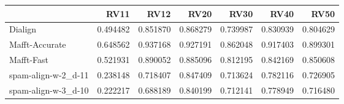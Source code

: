 \begin{tabular}{lrrrrrr}
\toprule
{} &      RV11 &      RV12 &      RV20 &      RV30 &      RV40 &      RV50 \\
\midrule
Dialign             &  0.494482 &  0.851870 &  0.868279 &  0.739987 &  0.830939 &  0.804629 \\
Mafft-Accurate      &  0.648562 &  0.937168 &  0.927191 &  0.862048 &  0.917403 &  0.899301 \\
Mafft-Fast          &  0.521931 &  0.890052 &  0.885096 &  0.812195 &  0.842169 &  0.850608 \\
spam-align-w-2\_d-11 &  0.238148 &  0.718407 &  0.847409 &  0.713624 &  0.782116 &  0.726905 \\
spam-align-w-3\_d-10 &  0.222217 &  0.688189 &  0.840199 &  0.712141 &  0.778949 &  0.716480 \\
\bottomrule
\end{tabular}
